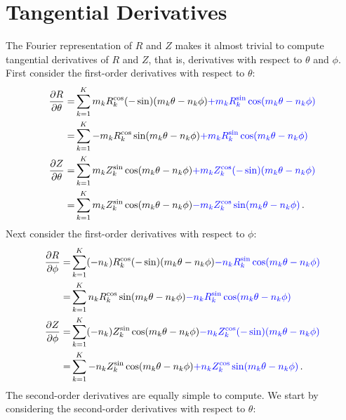 \section{Tangential Derivatives} \label{sec:tangential_derivatives}
The Fourier representation of $R$ and $Z$ makes it almost trivial to compute tangential derivatives of $R$ and $Z$,
that is, derivatives with respect to $\theta$ and $\phi$.
First consider the first-order derivatives with respect to $\theta$:
\begin{align}
     \frac{\partial R}{\partial \theta}
  =& \sum_{k=1}^{K}   m_k  R_k^\mathrm{cos} (- \sin) (m_k \theta - n_k \phi) {\color{blue} + m_k R_k^\mathrm{sin}   \cos (m_k \theta - n_k \phi) } \nonumber \\
  =& \sum_{k=1}^{K}  -m_k  R_k^\mathrm{cos}    \sin  (m_k \theta - n_k \phi) {\color{blue} + m_k R_k^\mathrm{sin}   \cos (m_k \theta - n_k \phi) } \label{eqn:dRdt} \\
     \frac{\partial Z}{\partial \theta}
  =& \sum_{k=1}^{K}   m_k  Z_k^\mathrm{sin}    \cos  (m_k \theta - n_k \phi) {\color{blue} + m_k Z_k^\mathrm{cos} (-\sin)(m_k \theta - n_k \phi) } \nonumber \\
  =& \sum_{k=1}^{K}   m_k  Z_k^\mathrm{sin}    \cos  (m_k \theta - n_k \phi) {\color{blue} - m_k Z_k^\mathrm{cos}   \sin (m_k \theta - n_k \phi) } \label{eqn:dZdt} \, .
\end{align}
Next consider the first-order derivatives with respect to $\phi$:
\begin{align}
     \frac{\partial R}{\partial \phi}
  =& \sum_{k=1}^{K} (-n_k) R_k^\mathrm{cos} (- \sin) (m_k \theta - n_k \phi) {\color{blue} - n_k R_k^\mathrm{sin}   \cos (m_k \theta - n_k \phi) } \nonumber \\
  =& \sum_{k=1}^{K}   n_k  R_k^\mathrm{cos}    \sin  (m_k \theta - n_k \phi) {\color{blue} - n_k R_k^\mathrm{sin}   \cos (m_k \theta - n_k \phi) } \label{eqn:dRdp} \\
     \frac{\partial Z}{\partial \phi}
  =& \sum_{k=1}^{K} (-n_k) Z_k^\mathrm{sin}    \cos  (m_k \theta - n_k \phi) {\color{blue} - n_k Z_k^\mathrm{cos} (-\sin)(m_k \theta - n_k \phi) } \nonumber \\
  =& \sum_{k=1}^{K}  -n_k  Z_k^\mathrm{sin}    \cos  (m_k \theta - n_k \phi) {\color{blue} + n_k Z_k^\mathrm{cos}   \sin (m_k \theta - n_k \phi) } \label{eqn:dZdp} \, .
\end{align}
The second-order derivatives are equally simple to compute.
We start by considering the second-order derivatives with respect to $\theta$:
